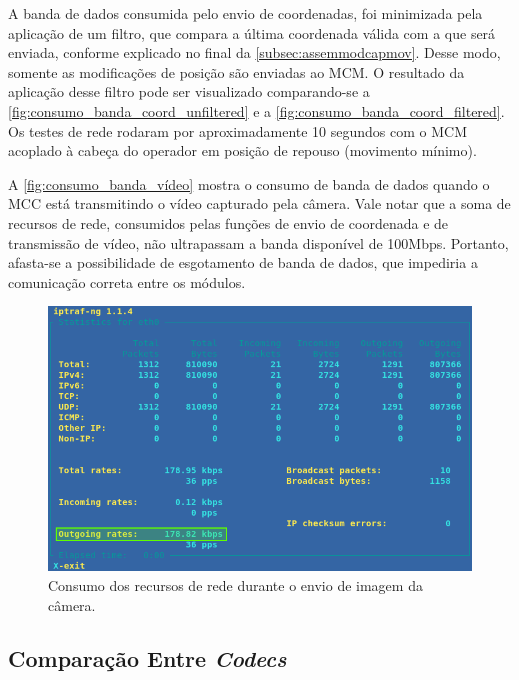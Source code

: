 A banda de dados consumida pelo envio de coordenadas, foi minimizada pela aplicação de um filtro, que compara a última coordenada válida com a que será enviada, conforme explicado no final da \autoref{subsec:assemmodcapmov}. Desse modo, somente as modificações de posição são enviadas ao MCM. O resultado da aplicação desse filtro pode ser visualizado comparando-se a \autoref{fig:consumo_banda_coord_unfiltered} e a \autoref{fig:consumo_banda_coord_filtered}. Os testes de rede rodaram por aproximadamente 10 segundos com o MCM acoplado à cabeça do operador em posição de repouso (movimento mínimo).\par

A \autoref{fig:consumo_banda_vídeo} mostra o consumo de banda de dados quando o MCC está transmitindo o vídeo capturado pela câmera. Vale notar que a soma de recursos de rede, consumidos pelas funções de envio de coordenada e de transmissão de vídeo, não ultrapassam a banda disponível de 100Mbps. Portanto, afasta-se a possibilidade de esgotamento de banda de dados, que impediria a comunicação correta entre os módulos.\par

\begin{figure}[H]
	\centering
	\includegraphics[width=1\textwidth]{figuras/consumo_banda_camera.png}
	\caption{Consumo dos recursos de rede durante o envio de imagem da câmera.}
	\label{fig:consumo_banda_vídeo}
\end{figure}

\subsection{Comparação Entre \textit{Codecs}}
\label{subsec:compcodecs}

